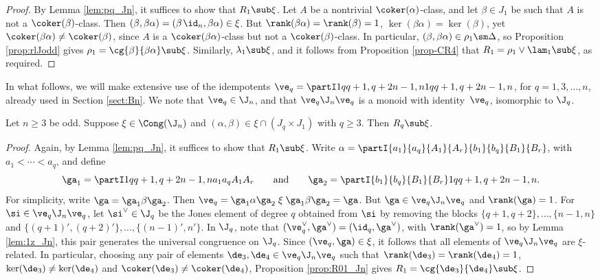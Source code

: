 \begin{proof} By Lemma \ref{lem:pq_Jn}, it suffices to show that $R_1\sub\xi$.  Let $A$ be a nontrivial $\coker(\alpha)$-class, and let $\beta\in J_1$ be such that $A$ is not a $\coker(\beta)$-class.  Then $(\beta,\beta\alpha)=(\beta\;\!\id_n,\beta\alpha)\in\xi$.  But $\rank(\beta\alpha)=\rank(\beta)=1$, $\ker(\beta\alpha)=\ker(\beta)$, yet $\coker(\beta\alpha)\not=\coker(\beta)$, since $A$ is a $\coker(\beta\alpha)$-class but not a $\coker(\beta)$-class.  In particular, $(\beta,\beta\alpha)\in\rho_1\sm\Delta$, so Proposition \ref{prop:rlJodd} gives $\rho_1=\cg{\beta}{\beta\alpha}\sub\xi$.  Similarly, $\lambda_1\sub\xi$, and it follows from Proposition \ref{prop-CR4} that $R_1=\rho_1\vee\lam_1\sub\xi$, as required. \end{proof}

In what follows,
we will make extensive use of the idempotents $\ve_q=\partI1q{q+1,q+2}{n-1,n}1q{q+1,q+2}{n-1,n}$, for $q=1,3,\ldots,n$, already used in Section \ref{sect:Bn}.  We note that $\ve_q\in\J_n$, and that $\ve_q\J_n\ve_q$ is a monoid with identity~$\ve_q$, isomorphic to $\J_q$.

%
\begin{lemma}\label{lem:qz_Jn}
Let $n\geq3$ be odd.  Suppose $\xi\in\Cong(\J_n)$ and $(\alpha,\beta)\in\xi\cap (J_q\times J_1)$ with $q\geq3$.  Then $R_q\sub\xi$.
\end{lemma}

\begin{proof} Again, by Lemma \ref{lem:pq_Jn}, it suffices to show that $R_1\sub\xi$.  Write $\alpha=\partI{a_1}{a_q}{A_1}{A_r}{b_1}{b_q}{B_1}{B_r}$, with $a_1<\cdots<a_q$, and define
\[
\ga_1=\partI1q{q+1,q+2}{n-1,n}{a_1}{a_q}{A_1}{A_r}
\qquad\text{and}\qquad
\ga_2=\partI{b_1}{b_q}{B_1}{B_r}1q{q+1,q+2}{n-1,n}.
\]
For simplicity, write $\ga=\ga_1\beta\ga_2$.  
%
Then $\ve_q=\ga_1\alpha\ga_2\mathrel\xi\ga_1\beta\ga_2=\ga$.  But $\ga\in\ve_q\J_n\ve_q$ and ${\rank(\ga)=1}$.  
%
For $\si\in\ve_q\J_n\ve_q$, let $\si^\vee\in\J_q$ be the Jones element of degree $q$ obtained from $\si$ by removing the blocks ${\{q+1,q+2\},\ldots,\{n-1,n\}}$ and $\{(q+1)',(q+2)'\},\ldots,\{(n-1)',n'\}$.  
%
In $\J_q$, note that $(\ve_q^\vee,\ga^\vee)=(\id_q,\ga^\vee)$, with ${\rank(\ga^\vee)=1}$, so by Lemma \ref{lem:1z_Jn}, this pair generates the universal congruence on $\J_q$.  Since $(\ve_q,\ga)\in\xi$, it follows that all elements of $\ve_q\J_n\ve_q$ are $\xi$-related.  In particular, choosing any pair of elements $\de_3,\de_4\in\ve_q\J_n\ve_q$ such that $\rank(\de_3)=\rank(\de_4)=1$, $\ker(\de_3)\not=\ker(\de_4)$ and $\coker(\de_3)\not=\coker(\de_4)$, Proposition \ref{prop:R01_Jn} gives $R_1=\cg{\de_3}{\de_4}\sub\xi$.  \end{proof}



